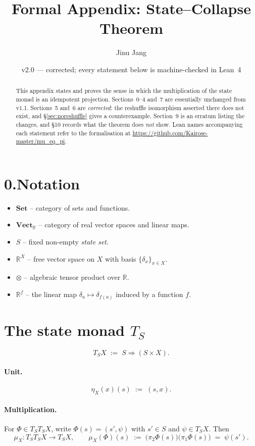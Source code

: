 \documentclass[12pt]{article}
\title{Formal Appendix: State--Collapse Theorem}
\author{Jinu Jang}
\date{v2.0 --- corrected; every statement below is machine-checked in Lean~4}
\theoremstyle{plain}
\theoremstyle{remark}
\newcommand{\Set}{\mathbf{Set}}
\newcommand{\Vect}{\mathbf{Vect}_{\mathbb R}}
\newcommand{\RR}{\mathbb R}
\begin{document}
\maketitle

\begin{abstract}
This appendix states and proves the sense in which the multiplication of the
state monad is an idempotent projection. Sections~0--4 and~7 are essentially
unchanged from v1.1. Sections~5 and~6 are \emph{corrected}: the reshuffle
isomorphism asserted there does not exist, and \S\ref{sec:noreshuffle} gives a
counterexample. Section~9 is an erratum listing the changes, and \S10 records
what the theorem does \emph{not} show. Lean names accompanying each statement
refer to the formalisation at
\url{https://github.com/Kairose-master/mu_eq_pi}.
\end{abstract}

\section*{0.\;Notation}
\begin{itemize}
  \item $\Set$ -- category of sets and functions.
  \item $\Vect$ -- category of real vector spaces and linear maps.
  \item $S$ -- fixed non-empty \emph{state set}.
  \item $\RR^{X}$ -- free vector space on $X$ with basis
        $\{\delta_x\}_{x\in X}$.
  \item $\otimes$ -- algebraic tensor product over $\RR$.
  \item $\RR^{f}$ -- the linear map $\delta_a\mapsto\delta_{f(a)}$ induced by a
        function $f$.
\end{itemize}

\bigskip
\section{The state monad \texorpdfstring{$T_S$}{T\_S}}
\[
T_S X \;:=\; S \Rightarrow (S\times X).
\]

\paragraph{Unit.}
\[
\eta_X(x)(s)\;:=\;(s,x).
\]

\paragraph{Multiplication.}
For $\Phi\in T_ST_SX$, write $\Phi(s)=(s',\psi)$ with $s'\in S$ and
$\psi\in T_SX$. Then
\[
\mu_X : T_S T_S X \longrightarrow T_S X,
\qquad
\mu_X(\Phi)(s) \;:=\; \bigl(\pi_2\Phi(s)\bigr)\bigl(\pi_1\Phi(s)\bigr)
\;=\;\psi(s').
\]
\end{document}
